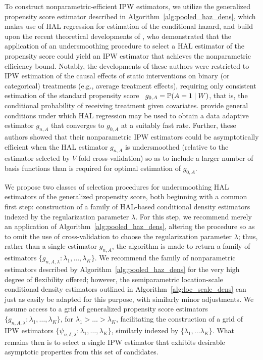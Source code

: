 To construct nonparametric-efficient IPW estimators, we utilize the generalized
propensity score estimator described in Algorithm~\ref{alg:pooled_haz_dens},
which makes use of HAL regression for estimation of the conditional hazard, and
build upon the recent theoretical developments of
\citet{ertefaie2020nonparametric}, who demonstrated that the application of an
undersmoothing procedure to select a HAL estimator of the propensity score could
yield an IPW estimator that achieves the nonparametric efficiency bound.
Notably, the developments of these authors were restricted to IPW estimation of
the causal effects of static interventions on binary (or categorical) treatments
(e.g., average treatment effects), requiring only consistent estimation of the
standard propensity score~\citep{rosenbaum1983central} $g_{0,A} = \mathbb{P}(A
= 1 \mid W)$, that is, the conditional probability of receiving treatment given
covariates. \citet{ertefaie2020nonparametric} provide general conditions under
which HAL regression may be used to obtain a data adaptive estimator $g_{n,A}$
that converges to $g_{0,A}$ at a suitably fast rate. Further, these authors
showed that their nonparametric IPW estimators could be asymptotically efficient
when the HAL estimator $g_{n,A}$ is undersmoothed (relative to the estimator
selected by $V$-fold cross-validation) so as to include a larger number of basis
functions than is required for optimal estimation of $g_{0,A}$.

We propose two classes of selection procedures for undersmoothing HAL estimators
of the generalized propensity score, both beginning with a common first step:
construction of a family of HAL-based conditional density estimators indexed by
the regularization parameter $\lambda$. For this step, we recommend merely an
application of Algorithm~\ref{alg:pooled_haz_dens}, altering the procedure so as
to omit the use of cross-validation to choose the regularization parameter
$\lambda$; thus, rather than a single estimator $g_{n,A}$, the algorithm is made
to return a family of estimators $\{g_{n,A,\lambda}: \lambda_1, \ldots,
\lambda_K\}$. We recommend the family of nonparametric estimators described by
Algorithm~\ref{alg:pooled_haz_dens} for the very high degree of flexibility
offered; however, the semiparametric location-scale conditional density
estimators outlined in Algorithm~\ref{alg:loc_scale_dens} can just as easily be
adapted for this purpose, with similarly minor adjustments. We assume
access to a grid of generalized propensity score estimators $\{g_{n,A,\lambda}:
\lambda_1, \ldots, \lambda_K\}$, for $\lambda_1 > \ldots > \lambda_K$,
facilitating the construction of a grid of IPW estimators
$\{\psi_{n,\delta,\lambda}: \lambda_1, \ldots, \lambda_K\}$, similarly indexed
by $\{\lambda_1, \ldots \lambda_K\}$. What remains then is to select a single
IPW estimator that exhibits desirable asymptotic properties from this set of
candidates.

